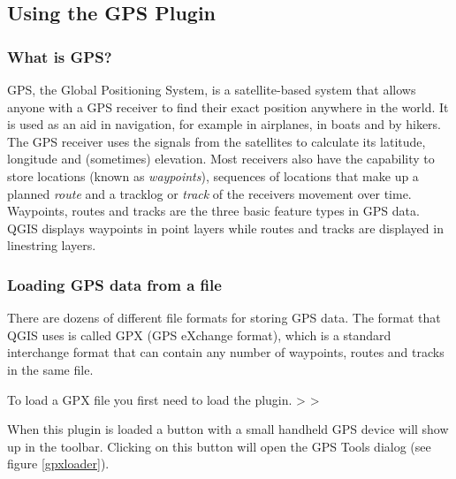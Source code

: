\subsection{Using the GPS Plugin}\label{label_plugingps}

\updatedisclaimer

\subsubsection{What is GPS?}\label{whatsgps}

GPS, the Global Positioning System, is a satellite-based system that allows anyone with a GPS receiver to find their exact position anywhere in the world.
It is used as an aid in navigation, for example in airplanes, in boats and by hikers.
The GPS receiver uses the signals from the satellites to calculate its latitude, longitude and (sometimes) elevation.
Most receivers also have the capability to store locations (known as \emph{waypoints}), sequences of locations that make up a planned \emph{route} and a tracklog or \emph{track} of the receivers movement over time.
Waypoints, routes and tracks are the three basic feature types in GPS data.
QGIS displays waypoints in point layers while routes and tracks are displayed in linestring layers.

\subsubsection{Loading GPS data from a file}\label{label_loadgps}

There are dozens of different file formats for storing GPS data.
The format that QGIS uses is called GPX (GPS eXchange format), which is a standard interchange format that can contain any number of waypoints, routes and tracks in the same file.

To load a GPX file you first need to load the plugin.
 >  > 

When this plugin is loaded a button with a small handheld GPS device will show up in the toolbar.
Clicking on this button  will open the GPS Tools dialog (see figure \ref{gpxloader}).



